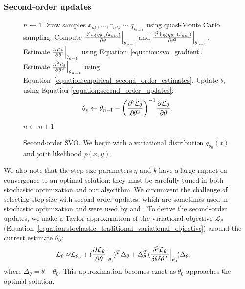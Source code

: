  \subsubsection{Second-order updates}
 \label{section:second_order_updates}
\begin{figure}
     \begin{algorithmic}[1]
    \setlength{\topsep}{1pt}
    \setlength{\itemsep}{2pt}
    \setlength{\parskip}{1pt}
    \setlength{\parsep}{1pt}

     \STATE $n \gets 1$
    \STATE Draw samples $x_{n1}, \ldots, x_{nM} \sim q_{\theta_{n - 1}}$ using quasi-Monte Carlo sampling.
    \STATE Compute $\frac{\partial \log q_{\theta_n}(x_{nm})}{\partial \theta} \Bigr|_{\theta_{n-1}}$ and
    $\frac{\partial^2 \log q_{\theta_n}(x_{nm})}{\partial {\theta}^2} \Bigr|_{\theta_{n-1}}$. %
    \STATE Estimate $\frac{\partial \mathcal{L}_\theta }{\partial \theta} \Bigr|_{\theta_{n-1}}$ using Equation~\ref{equation:svo_gradient}.
    \STATE Estimate $\frac{\partial^2 \mathcal{L}_\theta }{\partial {\theta}^2} \Bigr|_{\theta_{n-1}}$ using Equation~\ref{equation:empirical_second_order_estimates}.
    \STATE Update $\theta$, using Equation \ref{equation:second_order_updates}:
        \vspace{-10pt}
	\begin{align*}
     	   \displaystyle \theta_n \gets \theta_{n-1} - \left( 
     	\frac{\partial^2 \mathcal{L}_\theta }{\partial {\theta}^2}
     	\right)^{-1}
     	\frac{\partial \mathcal{L}_\theta }{\partial \theta}.  \end{align*}
    \vspace{-15pt}
    \STATE $n \gets n + 1$ %
    \ENDWHILE
   \end{algorithmic}
     \caption{Second-order SVO. We begin with a variational distribution
       $q_{\theta_0}(x)$ and joint likelihood $p(x, y)$.  }
     \label{figure:second_order_algorithm}
\end{figure}

We also note that the step size parameters $\eta$ and $k$ have a large
impact on convergence to an optimal solution: they must be carefully
tuned in both stochastic optimization and our algorithm. We circumvent
the challenge of selecting step size with second-order updates, which
are sometimes used in stochastic optimization
\cite{robbins:1951,bottou:2004} and were used by
\citet{carbonetto:2009} and \citet{wei:1990}.  To derive the
second-order updates, we make a Taylor approximation of the
variational objective $\mathcal{L}_\theta$
(Equation~\ref{equation:stochastic_traditional_variational_objective}) around the
current estimate $\theta_0$:
\begin{align}
  \mathcal{L}_\theta \approx & \mathcal{L}_{\theta_0} + ( \frac{\partial \mathcal{L}_\theta }{\partial \theta} \Bigr|_{\theta_0} )^T \Delta_\theta
 + \Delta_\theta^T ( \frac{\delta^2 \mathcal{L}_\theta }{\delta \theta \delta \theta^T} \Bigr|_{\theta_0} ) \Delta_\theta, \nonumber
\end{align}
where $\Delta_\theta = \theta - \theta_0$.  This approximation becomes
exact as $\theta_0$ approaches the optimal solution.


